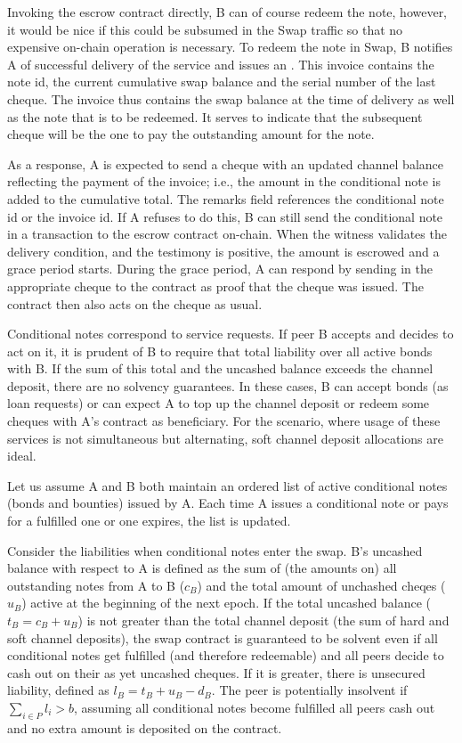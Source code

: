 Invoking the escrow contract directly, B can of course redeem the note, however, it would be nice if this could be subsumed in the Swap traffic so that no expensive on-chain operation is necessary. 
To redeem the note in Swap, B notifies A of successful delivery of the service and issues an . This invoice contains the note id, the current cumulative swap balance and the serial number of the last cheque. The invoice thus contains the swap balance at the time of delivery as well as the note that is to be redeemed. It serves to indicate that the subsequent cheque will be the one to pay the outstanding amount for the note.

As a response, A is expected to send a cheque with an updated channel balance reflecting the payment of the invoice; i.e., the amount in the conditional note is added to the cumulative total. The remarks field references the conditional note id or the invoice id. If A refuses to do this, B can still send the conditional note in a transaction to the escrow contract on-chain. When the witness validates the delivery condition, and the testimony is positive, the amount is escrowed and a grace period starts. During the grace period, A can respond by sending in the appropriate cheque to the contract as proof that the cheque was issued. The contract then also acts on the cheque as usual.

Conditional notes correspond to service requests. If peer B accepts and decides to act on it, it is prudent of B to require that total liability over all active bonds with B. If the sum of this total and the uncashed balance exceeds the channel deposit, there are no solvency guarantees. In these cases, B can accept bonds (as loan requests) or can expect A to top up the channel deposit or redeem some cheques with A's contract as  beneficiary. For the scenario, where usage of these services is not simultaneous but alternating, soft channel deposit allocations 
are ideal.

Let us assume A and B both maintain an ordered list of active conditional notes (bonds and bounties) issued by A.
Each time A issues a conditional note or pays for a fulfilled one or one expires, the list is updated.

Consider the liabilities when conditional notes enter the swap. 
B's uncashed balance with respect to A is defined as the sum of (the amounts on) all outstanding notes from A to B ($c_B$) and the total amount of unchashed cheqes ($u_B$) active at the beginning of the next epoch.
If the total uncashed balance ($t_B=c_B+u_B$) is not greater than the total channel deposit (the sum of hard and soft channel deposits), the swap contract is guaranteed to be solvent even if all conditional notes get fulfilled (and therefore redeemable) and all peers decide to cash out on their as yet uncashed cheques. If it is greater, there is unsecured liability, defined as $l_B = t_B + u_B - d_B$. The peer is potentially insolvent if $\sum_{i\in P}l_i > b$, assuming all conditional notes become fulfilled all peers cash out and no extra amount is deposited on the contract. 

